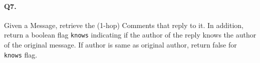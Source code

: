 \paragraph{Q7.}
Given a Message, retrieve the (1-hop) Comments that reply to it.
In addition, return a boolean flag \texttt{knows} indicating if the
author of the reply knows the author of the original message. If author
is same as original author, return false for \texttt{knows} flag.
